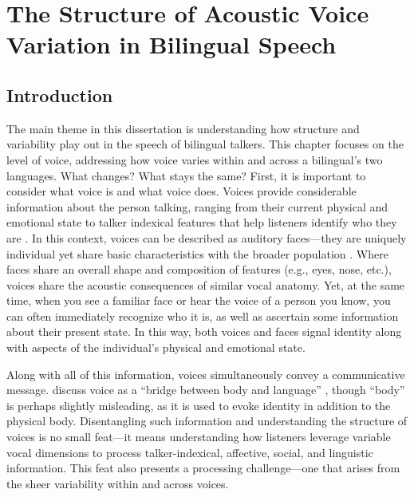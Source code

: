 \setcounter{chapter}{2}
\chapter{The Structure of Acoustic Voice Variation in Bilingual Speech}
\label{ch3:voice}

\section{Introduction}\label{ch3:sec:introduction}

The main theme in this dissertation is understanding how structure and variability play out in the speech of bilingual talkers. This chapter focuses on the level of voice, addressing how voice varies within and across a bilingual's two languages. What changes? What stays the same? First, it is important to consider what voice is and what voice does. Voices provide considerable information about the person talking, ranging from their current physical and emotional state to talker indexical features that help listeners identify who they are \citep{podesva_2015_voice}. In this context, voices can be described as auditory faces---they are uniquely individual yet share basic characteristics with the broader population \citep{belin_2004_voice}. Where faces share an overall shape and composition of features (e.g., eyes, nose, etc.), voices share the acoustic consequences of similar vocal anatomy. Yet, at the same time, when you see a familiar face or hear the voice of a person you know, you can often immediately recognize who it is, as well as ascertain some information about their present state. In this way, both voices and faces signal identity along with aspects of the individual's physical and emotional state. 

Along with all of this information, voices simultaneously convey a communicative message. \citeauthor{podesva_2015_voice} discuss voice as a ``bridge between body and language'' \citeyearpar[][p. 175]{podesva_2015_voice}, though ``body'' is perhaps slightly misleading, as it is used to evoke identity in addition to the physical body. Disentangling such information and understanding the structure of voices is no small feat---it means understanding how listeners leverage variable vocal dimensions to process talker-indexical, affective, social, and linguistic information. This feat also presents a processing challenge---one that arises from the sheer variability within and across voices. 

